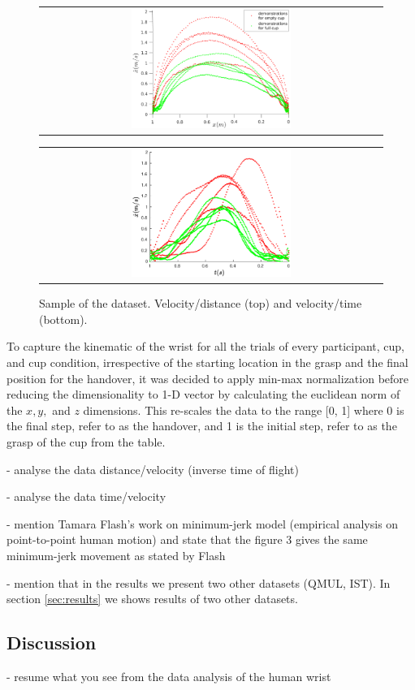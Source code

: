     \begin{figure}
        \centering
        \begin{tabular}{@{}c@{}}
            \centering
            \includegraphics[width=0.48\textwidth,height=0.25\textheight]{Images/vel_distance_plot.eps}
        \end{tabular}
        \baselineskip
        \begin{tabular}{@{}c@{}}
            \centering 
            \includegraphics[width=0.48\textwidth,height=0.25\textheight]{Images/vel_time_plot.eps}
        \end{tabular}
        \caption{Sample of the dataset. Velocity/distance (top) and velocity/time (bottom).}
        \label{fig:vel_distance_time}
    \end{figure}

To capture the kinematic of the wrist for all the trials of every participant, cup, and cup condition, irrespective of the starting location in the grasp and the final position for the handover, it was decided to apply min-max normalization before reducing the dimensionality to 1-D vector by calculating the euclidean norm of the $x, y,$ and $z$ dimensions. This re-scales the data to the range [0, 1] where 0 is the final step, refer to as the handover, and 1 is the initial step, refer to as the grasp of the cup from the table. 

- analyse the data distance/velocity (inverse time of flight)

- analyse the data time/velocity

- mention Tamara Flash's work on minimum-jerk model (empirical analysis on point-to-point human motion) and state that the figure 3 gives the same minimum-jerk movement as stated by Flash

- mention that in the results we present two other datasets (QMUL, IST). In section \ref{sec:results} we shows results of two other datasets.

\subsection{Discussion}

- resume what you see from the data analysis of the human wrist

